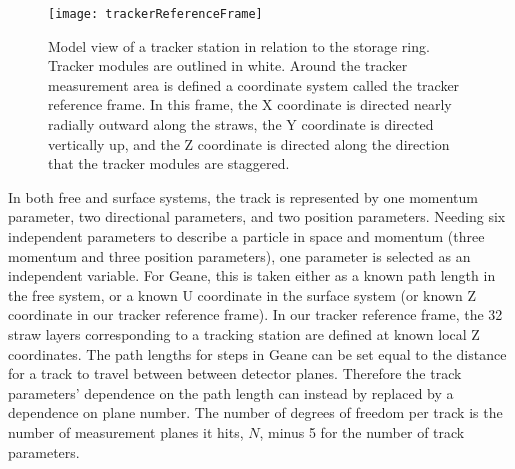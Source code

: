 \begin{figure}
  \centering
  \texttt{[image: trackerReferenceFrame]}
    \caption[Tracker reference frame]{Model view of a tracker station in relation to the storage ring. Tracker modules are outlined in white. Around the tracker measurement area is defined a coordinate system called the tracker reference frame. In this frame, the X coordinate is directed nearly radially outward along the straws, the Y coordinate is directed vertically up, and the Z coordinate is directed along the direction that the tracker modules are staggered.}
    \label{fig:trackerReferenceFrame}
\end{figure}


In both free and surface systems, the track is represented by one momentum parameter, two directional parameters, and two position parameters. Needing six independent parameters to describe a particle in space and momentum (three momentum and three position parameters), one parameter is selected as an independent variable. For Geane, this is taken either as a known path length in the free system, or a known U coordinate in the surface system (or known Z coordinate in our tracker reference frame). In our tracker reference frame, the 32 straw layers corresponding to a tracking station are defined at known local Z coordinates. The path lengths for steps in Geane can be set equal to the distance for a track to travel between between detector planes. Therefore the track parameters' dependence on the path length can instead by replaced by a dependence on plane number. The number of degrees of freedom per track is the number of measurement planes it hits, $N$, minus 5 for the number of track parameters.


